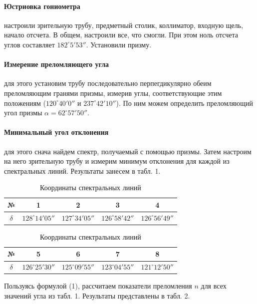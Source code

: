 \documentclass[a4paper,12pt]{article}
\begin{document}
\paragraph{Юстриовка гониометра} настроили зрительную трубу, предметный столик, коллиматор, входную щель, начало отсчета. В общем, настроили все, что смогли. При этом ноль отсчета углов составляет $182^\circ5'53''$. Установили призму.

\paragraph{Измерение преломляющего угла} для этого установим трубу последовательно перпегдикулярно обеим преломляющим гранями призмы, измерив углы, соответствующие этим положениям ($120^\circ40'0''$ и $237^\circ42'10''$). По ним можем определить преломляющий угол призмы $\alpha = 62^\circ57'50''$.

\paragraph{Минимальный угол отклонения} для этого снача найдем спектр, получаемый с помощью призмы. Затем настроим на него зрительную трубу и измерим минимум отклонения для каждой из спектральных линий. Результаты занесем в табл. 1.

\begin{table}[H]
    \centering
    \caption{Координаты спектральных линий}
    \begin{tabular}{|c|c|c|c|c|} \hline
         № & 1 & 2 & 3 & 4 \\ \hline
         $\delta$ & $128^\circ14'05''$ & $127^\circ34'05''$ & $126^\circ58'42''$ & $126^\circ56'49''$ \\ \hline
    \end{tabular}

    \vspace{0.5cm} %

    \begin{tabular}{|c|c|c|c|c|} \hline
         № & 5 & 6 & 7 & 8 \\ \hline
         $\delta$ & $126^\circ25'30''$ & $125^\circ09'55''$ & $123^\circ04'55''$ & $121^\circ12'50''$ \\ \hline
    \end{tabular}
\end{table}

\noindent
Пользуясь формулой (1), рассчитаем показатели преломления $n$ для всех значений угла из табл. 1. Результаты представлены в табл. 2.
\end{document}

